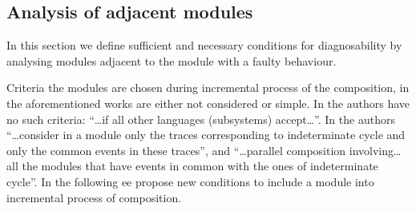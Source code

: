 \documentclass[a4paper, 10pt, conference]{ieeeconf} \IEEEoverridecommandlockouts
\begin{document}


\subsection{Analysis of adjacent modules}
In this section we define sufficient and necessary conditions for diagnosability
by analysing modules adjacent to the module with a faulty behaviour.

Criteria the modules are chosen during incremental process of
the composition, in the aforementioned works are either not considered or
simple. In \cite{debouk_modular_2002} the authors have no such criteria: 
``\ldots if all other languages (subsystems) accept\ldots''.
In \cite{contant_diagnosability_2006} the authors ``\ldots consider in a module
only the traces corresponding to indeterminate cycle and only the common events
in these traces'', and ``\ldots parallel composition involving\ldots all the
modules that have events in common with the ones of indeterminate cycle''.
In the following ee propose new conditions to include a module into incremental
process of composition.


\end{document}
